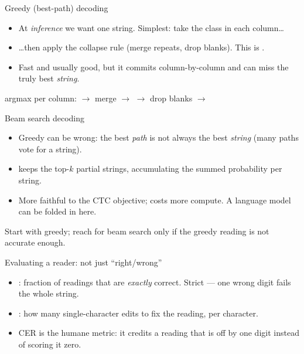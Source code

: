 \documentclass[10pt,aspectratio=169]{beamer}
\begin{document}
\begin{frame}{Greedy (best-path) decoding}
  \begin{itemize}
    \item At \emph{inference} we want one string. Simplest: take the  class in each column\ldots
    \item \ldots then apply the collapse rule (merge repeats, drop blanks). This is .
    \item Fast and usually good, but it commits column-by-column and can miss the truly best \emph{string}.
  \end{itemize}
  \begin{mathbox}
    argmax per column:  $\to$ merge $\to$ 
    $\to$ drop blanks $\to$ 
  \end{mathbox}
\end{frame}

\begin{frame}{Beam search decoding}
  \begin{itemize}
    \item Greedy can be wrong: the best \emph{path} is not always the best \emph{string} (many paths vote for a string).
    \item {} keeps the top-$k$ partial strings, accumulating the summed probability per string.
    \item More faithful to the CTC objective; costs more compute. A language model can be folded in here.
  \end{itemize}
  \begin{goodbox}
    Start with greedy; reach for beam search only if the greedy reading is not accurate enough.
  \end{goodbox}
\end{frame}

\begin{frame}{Evaluating a reader: not just ``right/wrong''}
  \begin{itemize}
    \item {}: fraction of readings that are \emph{exactly} correct. Strict --- one wrong digit fails the whole string.
    \item {}: how many single-character edits to fix the reading, per character.
    \item CER is the humane metric: it credits a reading that is off by one digit instead of scoring it zero.
  \end{itemize}
\end{frame}
\end{document}
